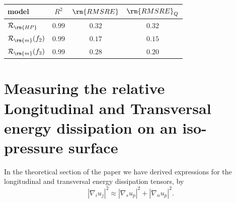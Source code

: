 \documentclass[draft,jgrga]{agutexSI2019}
\begin{document}
\begin{article}
\vspace{1cm}
\\
\begin{tabular}{l|c|c|c}
\hline
model & $R^2$  & $\rm{RMSRE}$ & $\rm{RMSRE}_Q$  \\
\hline
$\mathcal{R}_{\rm{HP}}$ 	& $0.99$ & $0.32$ & $0.32$\\
$\mathcal{R}_{\rm{m}}(f_2)$	& $0.99$ & $0.17$ & $0.15$\\
$\mathcal{R}_{\rm{m}}(f_3)$	& $0.99$ & $0.28$ & $0.20$\\
\end{tabular}




\section{Measuring the relative Longitudinal and Transversal energy dissipation on an iso-pressure surface} 
In the theoretical section of the paper we have derived expressions for the longitudinal and transversal energy dissipation tensors, by 
\begin{equation}\label{eq:reduced_dissipation_tensor}
\left|\nabla_i u_j\right|^2 \approx  \left|\nabla_s u_p\right|^2 + \left|\nabla_n u_p\right|^2 .
\end{equation}

\end{article}
\end{document}
